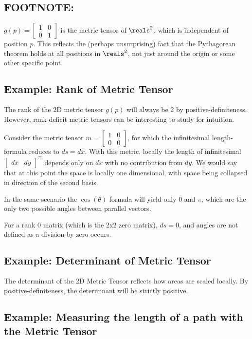 \subsection{FOOTNOTE:}
$g(p) = \begin{bmatrix} 1 & 0 \\ 0 & 1\end{bmatrix}$ is the metric tensor of $\reals^2$, which is independent of position $p$. This reflects the (perhaps unsurprising) fact that the Pythagorean theorem holds at all positions in $\reals^2$, not just around the origin or some other specific point.


\subsection{ Example: Rank of Metric Tensor}

The rank of the 2D metric tensor $g(p)$ will always be 2 by positive-definiteness. However, rank-deficit metric tensors can be interesting to study for intuition. 

Consider the metric tensor $m= \begin{bmatrix} 1 & 0 \\ 0 & 0\end{bmatrix}$, for which the infinitesimal length-formula reduces to $ds = dx$. With this metric, locally the length of infinitesimal $\begin{bmatrix} dx & dy \end{bmatrix}^\top$ depends only on $dx$ with no contribution from $dy$. We would say that at this point the space is locally one dimensional, with space being collapsed in direction of the second basis. 

In the same scenario the $\cos(\theta)$ formula will yield only $0$ and $\pi$, which are the only two possible angles between parallel vectors. 

For a rank 0 matrix (which is the 2x2 zero matrix), $ds = 0$, and angles are not defined as a division by zero occurs.

\subsection{ Example: Determinant of Metric Tensor}

The determinant of the 2D Metric Tensor reflects how areas are scaled locally. By positive-definiteness, the determinant will be strictly positive.

\subsection{ Example: Measuring the length of a path with the Metric Tensor}

